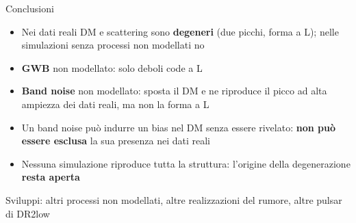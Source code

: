 \begin{frame}{Conclusioni}
  \begin{itemize}\setlength{\itemsep}{3pt}
    \item Nei dati reali DM e scattering sono \textbf{degeneri} (due picchi, forma a L);
          nelle simulazioni senza processi non modellati no
    \item \textbf{GWB} non modellato: solo deboli code a L
    \item \textbf{Band noise} non modellato: sposta il DM e ne riproduce il picco ad alta ampiezza
          dei dati reali, ma non la forma a L
    \item Un band noise può indurre un bias nel DM senza essere rivelato:
          \textbf{non può essere esclusa} la sua presenza nei dati reali
    \item Nessuna simulazione riproduce tutta la struttura:
          l'origine della degenerazione \textbf{resta aperta}
  \end{itemize}
  \vspace{2mm}
  \centering
  \vspace{1mm}
  \begin{flushleft}
  {\small\color{grigio} Sviluppi: altri processi non modellati, altre realizzazioni del rumore,
   altre pulsar di DR2low}
  \end{flushleft}
\end{frame}

